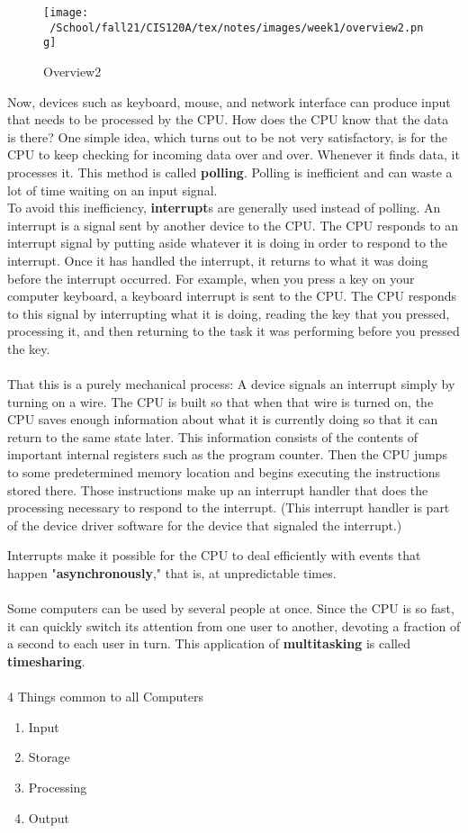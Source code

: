 \documentclass{article}
\begin{document}
\begin{figure}[h]
\centering
\texttt{[image: ~/School/fall21/CIS120A/tex/notes/images/week1/overview2.png]}
\caption{Overview2\label{Overview2.png}}
\end{figure}

Now, devices such as keyboard, mouse, and network interface can produce input that needs to be processed by the CPU. How does the CPU know that the data is there? One simple idea, which turns out to be not very satisfactory, is for the CPU to keep checking for incoming data over and over. Whenever it finds data, it processes it. This method is called \textbf{polling}.
Polling is inefficient and can waste a lot of time waiting on an input signal.
\\
To avoid this inefficiency, \textbf{interrupt}s are generally used instead of polling. An interrupt is a signal sent by another device to the CPU. The CPU responds to an interrupt signal by putting aside whatever it is doing in order to respond to the interrupt. Once it has handled the interrupt, it returns to what it was doing before the interrupt occurred. For example, when you press a key on your computer keyboard, a keyboard interrupt is sent to the CPU. The CPU responds to this signal by interrupting what it is doing, reading the key that you pressed, processing it, and then returning to the task it was performing before you pressed the key.
\\
\\
That this is a purely mechanical process: A device signals an interrupt simply by turning on a wire. The CPU is built so that when that wire is turned on, the CPU saves enough information about what it is currently doing so that it can return to the same state later. This information consists of the contents of important internal registers such as the program counter. Then the CPU jumps to some predetermined memory location and begins executing the instructions stored there. Those instructions make up an interrupt handler that does the processing necessary to respond to the interrupt. (This interrupt handler is part of the device driver software for the device that signaled the interrupt.)

Interrupts make it possible for the CPU to deal efficiently with events that happen "\textbf{asynchronously}," that is, at unpredictable times.
\\
\\
Some computers can be used by several people at once. Since the CPU is so fast, it can quickly switch its attention from one user to another, devoting a fraction of a second to each user in turn. This application of \textbf{multitasking} is called \textbf{timesharing}.
\\
\\
4 Things common to all Computers
\begin{enumerate}
\item Input
\item Storage
\item Processing
\item Output
\end{enumerate}
\end{document}
